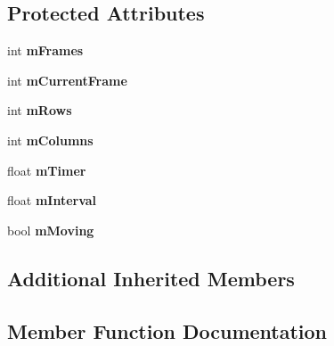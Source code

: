 \subsection*{Protected Attributes}
\begin{DoxyCompactItemize}
\item 
\mbox{\label{class_g_m_t_b_1_1_entities_1_1_animating_entity_a9a31c77ec6fee6249ed0b8416ff5e32b}} 
int {\bfseries m\+Frames}
\item 
\mbox{\label{class_g_m_t_b_1_1_entities_1_1_animating_entity_a24685166bb5b71ca76020cb82a3bedcf}} 
int {\bfseries m\+Current\+Frame}
\item 
\mbox{\label{class_g_m_t_b_1_1_entities_1_1_animating_entity_ad3ee2cfc25644473e9f057e2c2d37e3d}} 
int {\bfseries m\+Rows}
\item 
\mbox{\label{class_g_m_t_b_1_1_entities_1_1_animating_entity_adb7edb015c31953489e59b2d01be2aa9}} 
int {\bfseries m\+Columns}
\item 
\mbox{\label{class_g_m_t_b_1_1_entities_1_1_animating_entity_a15821606d43338559b74ee51c04b63d8}} 
float {\bfseries m\+Timer}
\item 
\mbox{\label{class_g_m_t_b_1_1_entities_1_1_animating_entity_a5b1d2641db6dd4b6eca76d396227826b}} 
float {\bfseries m\+Interval}
\item 
\mbox{\label{class_g_m_t_b_1_1_entities_1_1_animating_entity_a4570558070c39faf3f2e53b5063986ab}} 
bool {\bfseries m\+Moving}
\end{DoxyCompactItemize}
\subsection*{Additional Inherited Members}


\subsection{Member Function Documentation}
\mbox{\label{class_g_m_t_b_1_1_entities_1_1_animating_entity_a34e8160516927afb278915c3211b38c5}} 
